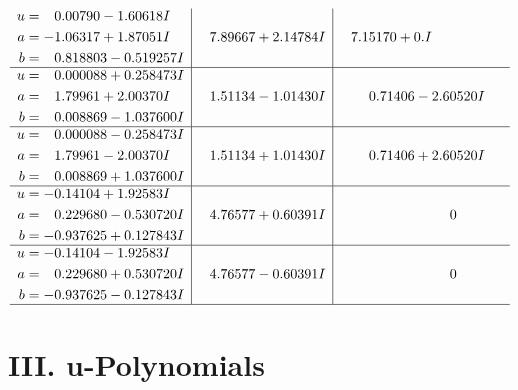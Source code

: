\documentclass[1p]{elsarticle_modified}
\theoremstyle{definition}
\begin{document}
$$\begin{array}{c|c|c}
\begin{aligned}
u &= \phantom{-}0.00790 - 1.60618 I \\
a &= -1.06317 + 1.87051 I \\
b &= \phantom{-}0.818803 - 0.519257 I\end{aligned}
 & \phantom{-}7.89667 + 2.14784 I & \phantom{-}7.15170 + 0. I\phantom{ +0.000000I} \\ \hline\begin{aligned}
u &= \phantom{-}0.000088 + 0.258473 I \\
a &= \phantom{-}1.79961 + 2.00370 I \\
b &= \phantom{-}0.008869 - 1.037600 I\end{aligned}
 & \phantom{-}1.51134 - 1.01430 I & \phantom{-}0.71406 - 2.60520 I \\ \hline\begin{aligned}
u &= \phantom{-}0.000088 - 0.258473 I \\
a &= \phantom{-}1.79961 - 2.00370 I \\
b &= \phantom{-}0.008869 + 1.037600 I\end{aligned}
 & \phantom{-}1.51134 + 1.01430 I & \phantom{-}0.71406 + 2.60520 I \\ \hline\begin{aligned}
u &= -0.14104 + 1.92583 I \\
a &= \phantom{-}0.229680 - 0.530720 I \\
b &= -0.937625 + 0.127843 I\end{aligned}
 & \phantom{-}4.76577 + 0.60391 I & \phantom{-0.000000 } 0 \\ \hline\begin{aligned}
u &= -0.14104 - 1.92583 I \\
a &= \phantom{-}0.229680 + 0.530720 I \\
b &= -0.937625 - 0.127843 I\end{aligned}
 & \phantom{-}4.76577 - 0.60391 I & \phantom{-0.000000 } 0\\
 \hline 
 \end{array}$$\newpage
\newpage\renewcommand{\arraystretch}{1}
\centering \section*{ III. u-Polynomials}
\end{document}
